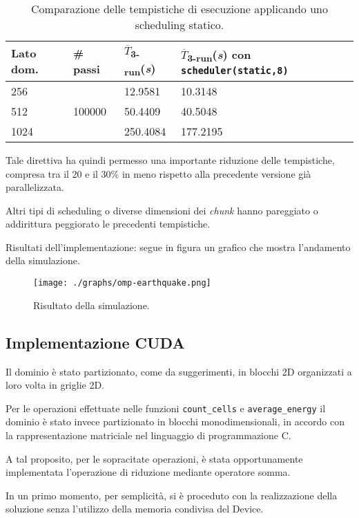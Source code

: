 \begin{table}[ht]
\begin{tabularx}{\linewidth}{XXXX}
\toprule
Lato dom. & \# passi & $\overline{T}$\textsubscript{3-run}(\textit{s})&
$\overline{T}$\textsubscript{3-run}(\textit{s}) con \texttt{scheduler(static,8)}\\
\midrule
 256 & \multirow{3}{*}{100000} & 12.9581 & 10.3148 \\
 512 && 50.4409 & 40.5048 \\
 1024 && 250.4084 & 177.2195 \\
\bottomrule
\end{tabularx}
\caption{\label{tab:scheduler}Comparazione delle tempistiche di esecuzione
applicando uno scheduling statico.}
\end{table}

Tale direttiva ha quindi permesso una importante riduzione delle tempistiche,
compresa tra il 20 e il 30\% in meno rispetto alla precedente versione già
parallelizzata.

Altri tipi di scheduling o diverse dimensioni dei \textit{chunk} hanno
pareggiato o addirittura peggiorato le precedenti tempistiche.


Risultati dell'implementazione: segue in figura un grafico che mostra
l'andamento della simulazione.

\begin{figure}[h!]
  \centering
  \texttt{[image: ./graphs/omp-earthquake.png]}
  \caption{Risultato della simulazione.}\label{fig:simulation1}
\end{figure}

\subsection{Implementazione CUDA}

Il dominio è stato partizionato, come da suggerimenti, in blocchi 2D organizzati
a loro volta in griglie 2D.

Per le operazioni effettuate nelle funzioni \texttt{count\_cells} e
\texttt{average\_energy} il dominio è stato invece partizionato in blocchi
monodimensionali, in accordo con la rappresentazione matriciale nel linguaggio
di programmazione C.

A tal proposito, per le sopracitate operazioni, è stata opportunamente
implementata l'operazione di riduzione mediante operatore somma.

In un primo momento, per semplicità, si è proceduto con la realizzazione della
soluzione senza l'utilizzo della memoria condivisa del Device.
